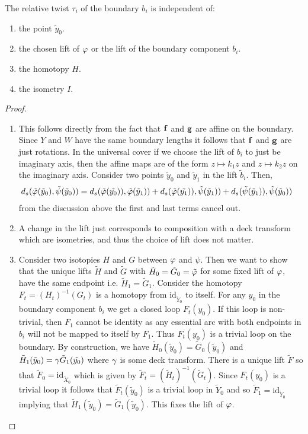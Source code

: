 \begin{proposition}
  The relative twist $\tau_i$ of the boundary $b_i$ is independent of: 
  \begin{enumerate}
    \item the point $\tilde{y}_0$.
    \item the chosen lift of $\varphi$ or the lift of the boundary component $b_i$.
    \item the homotopy $H$.
    \item the isometry $I$. 
  \end{enumerate}
\end{proposition}
\begin{proof} 
  \begin{enumerate}
    \item This follows directly from the fact that $\mathbf{f}$ and $\mathbf{g}$ are affine on the boundary. Since $Y$ and $W$ have the same boundary lengths it follows that $\mathbf{f}$ and $\mathbf{g}$ are just rotations. In the universal cover if we choose the lift of $b_i$ to just be imaginary axis, then the affine maps are of the form $z\mapsto k_1z$ and $z\mapsto k_2z$ on the imaginary axis. Consider two points $\tilde{y}_0$ and $\tilde{y}_1$ in the lift $\tilde{b}_i$. Then,
      \begin{align*}
        d_s(\tilde{\varphi}(\tilde{y}_0),\tilde{\psi}(\tilde{y}_0)) &= d_s(\tilde{\varphi}(\tilde{y_0})), \tilde{\varphi}(\tilde{y}_1)) + d_s(\tilde{\varphi}(\tilde{y_1})), \tilde{\psi}(\tilde{y}_1)) + d_s(\tilde{\psi}(\tilde{y}_1)), \tilde{\psi}(\tilde{y}_0)) 
      \end{align*}
      from the discussion above the first and last terms cancel out.
    \item A change in the lift just corresponds to composition with a deck transform which are isometries, and thus the choice of lift does not matter.  
    \item Consider two isotopies $H$ and $G$ between $\varphi$ and $\psi$. Then we want to show that the unique lifts $\tilde{H}$ and $\tilde{G}$ with $\tilde{H}_0 = \tilde{G}_0 = \tilde{\varphi}$ for some fixed lift of $\varphi$, have the same endpoint i.e. $\tilde{H}_1=\tilde{G}_1$. Consider the homotopy $F_t = (H_t)^{-1}(G_t)$ is a homotopy from $\text{id}_{\tilde{Y}_0}$ to itself. For any $y_0$ in the boundary component $b_i$ we get a closed loop $F_t(y_0)$. If this loop is non-trivial, then $F_1$ cannot be identity as any essential arc with both endpoints in $b_i$ will not be mapped to itself by $F_1$. Thus $F_t(y_0)$ is a trivial loop on the boundary. By construction, we have $\tilde{H}_0(\tilde{y}_0) = \tilde{G}_0(\tilde{y}_0)$ and $\tilde{H}_1(\tilde{y}_0) = \gamma\tilde{G}_1(\tilde{y_0})$ where $\gamma$ is some deck transform. There is a unique lift $\tilde{F}$ so that $\tilde{F}_0 = \text{id}_{\tilde{X}_0}$ which is given by $\tilde{F}_t = (\tilde{H}_t)^{-1}(\tilde{G}_t)$. Since $F_t(y_0)$ is a trivial loop it follows that $\tilde{F}_t(\tilde{y}_0)$ is a trivial loop in $\tilde{Y}_0$ and so $\tilde{F}_1 = \text{id}_{\tilde{Y}_0}$ implying that $\tilde{H}_1(\tilde{y}_0) = \tilde{G}_1(\tilde{y}_0)$. This fixes the lift of $\varphi$.

\end{enumerate}
\end{proof}
